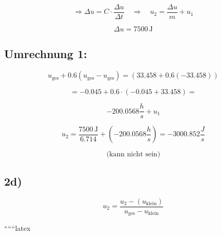 \[
\Rightarrow \Delta u = C \cdot \frac{\Delta u}{\Delta t} \quad \Rightarrow \quad u_{2} = \frac{\Delta u}{m} + u_{1}
\]

\[
\Delta u = 7500 \, \text{J}
\]

\subsection*{Umrechnung 1:}

\[
u_{\text{ges}} + 0.6 \left( u_{\text{ges}} - u_{\text{ges}} \right) = \left( 33.458 + 0.6 \left( -33.458 \right) \right)
\]

\[
= -0.045 + 0.6 \cdot (-0.045 + 33.458) = 
\]

\[
-200.0568 \frac{h}{s} + u_{1}
\]

\[
u_{2} = \frac{7500 \, \text{J}}{6.714} + \left( -200.0568 \frac{h}{s} \right) = -3000.852 \frac{J}{s}
\]

\[
\text{(kann nicht sein)}
\]

\subsection*{2d)}

\[
u_{2} = \frac{u_{2} - (u_{\text{klein}})}{u_{\text{ges}} - u_{\text{klein}}}
\]

``````latex


